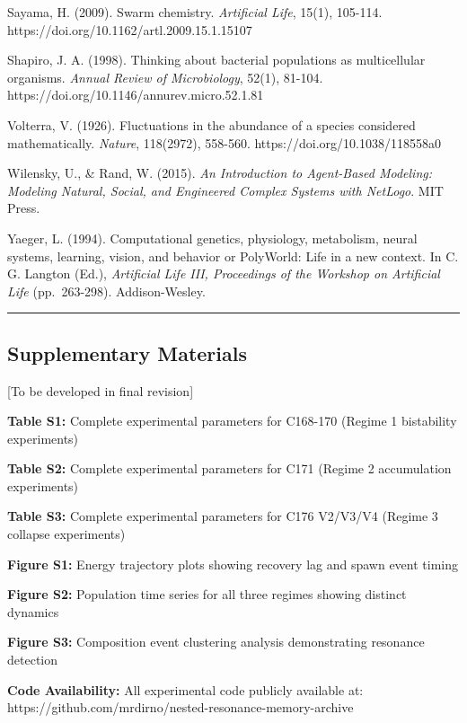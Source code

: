 \documentclass[
]{article}
\begin{document}
Sayama, H. (2009). Swarm chemistry. \emph{Artificial Life}, 15(1),
105-114. https://doi.org/10.1162/artl.2009.15.1.15107

Shapiro, J. A. (1998). Thinking about bacterial populations as
multicellular organisms. \emph{Annual Review of Microbiology}, 52(1),
81-104. https://doi.org/10.1146/annurev.micro.52.1.81

Volterra, V. (1926). Fluctuations in the abundance of a species
considered mathematically. \emph{Nature}, 118(2972), 558-560.
https://doi.org/10.1038/118558a0

Wilensky, U., \& Rand, W. (2015). \emph{An Introduction to Agent-Based
Modeling: Modeling Natural, Social, and Engineered Complex Systems with
NetLogo}. MIT Press.

Yaeger, L. (1994). Computational genetics, physiology, metabolism,
neural systems, learning, vision, and behavior or PolyWorld: Life in a
new context. In C. G. Langton (Ed.), \emph{Artificial Life III,
Proceedings of the Workshop on Artificial Life} (pp.~263-298).
Addison-Wesley.

\begin{center}\rule{0.5\linewidth}{0.5pt}\end{center}

\subsection{Supplementary Materials}\label{supplementary-materials}

{[}To be developed in final revision{]}

\textbf{Table S1:} Complete experimental parameters for C168-170 (Regime
1 bistability experiments)

\textbf{Table S2:} Complete experimental parameters for C171 (Regime 2
accumulation experiments)

\textbf{Table S3:} Complete experimental parameters for C176 V2/V3/V4
(Regime 3 collapse experiments)

\textbf{Figure S1:} Energy trajectory plots showing recovery lag and
spawn event timing

\textbf{Figure S2:} Population time series for all three regimes showing
distinct dynamics

\textbf{Figure S3:} Composition event clustering analysis demonstrating
resonance detection

\textbf{Code Availability:} All experimental code publicly available at:
https://github.com/mrdirno/nested-resonance-memory-archive
\end{document}
